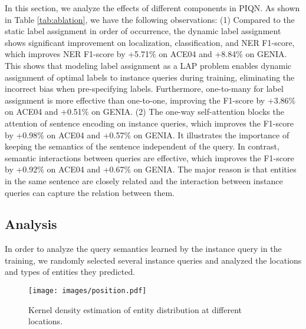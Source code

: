 \documentclass[11pt]{article}
\begin{document}
In this section, we analyze the effects of different components in PIQN.
As shown in Table \ref{tab:ablation}, we have the following observations: (1) Compared to the static label assignment in order of occurrence, the dynamic label assignment shows significant improvement on localization, classification, and NER F1-score, which improves NER F1-score by +5.71\% on ACE04 and +8.84\% on GENIA. This shows that modeling label assignment as a LAP problem enables dynamic assignment of optimal labels to instance queries during training, eliminating the incorrect bias when pre-specifying labels. Furthermore, one-to-many for label assignment is more effective than one-to-one, improving the F1-score by +3.86\% on ACE04 and +0.51\% on GENIA. 
(2) The one-way self-attention blocks the attention of sentence encoding on instance queries, which improves the F1-score by +0.98\% on ACE04 and +0.57\% on GENIA. It illustrates the importance of keeping the semantics of the sentence independent of the query. In contrast, semantic interactions between queries are effective, which improves the F1-score by +0.92\% on ACE04 and +0.67\% on GENIA. 
The major reason is that entities in the same sentence are closely related and the interaction between instance queries can capture the relation between them.



























\subsection{Analysis}






\label{analysis1}

In order to analyze the query semantics learned by the instance query in the training, we randomly selected several instance queries and analyzed the locations and types of entities they predicted.



\begin{figure}[h]
  \centering
  \texttt{[image: images/position.pdf]}
  \caption{Kernel density estimation of entity distribution at different locations.}
  \label{fig:position}
\end{figure}
\end{document}
